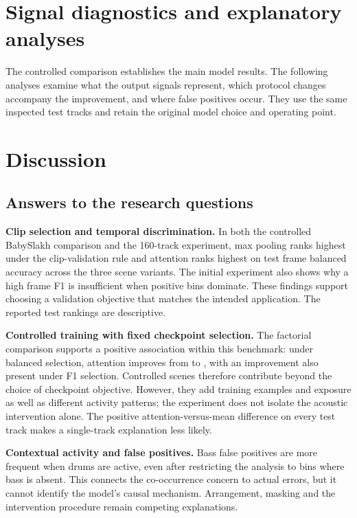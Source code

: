 \documentclass[10pt,a4paper]{article}
\begin{document}
\section{Signal diagnostics and explanatory analyses}
The controlled comparison establishes the main model results. The following analyses examine what the output signals represent, which protocol changes accompany the improvement, and where false positives occur. They use the same inspected test tracks and retain the original model choice and operating point.





\section{Discussion}
\subsection{Answers to the research questions}
\textbf{Clip selection and temporal discrimination.} In both the controlled BabySlakh comparison and the 160-track experiment, max pooling ranks highest under the clip-validation rule and attention ranks highest on test frame balanced accuracy across the three scene variants. The initial experiment also shows why a high frame F1 is insufficient when positive bins dominate. These findings support choosing a validation objective that matches the intended application. The reported test rankings are descriptive.

\textbf{Controlled training with fixed checkpoint selection.} The factorial comparison supports a positive association within this benchmark: under balanced selection, attention improves from \OriginalAttentionBA{} to \ControlledAttentionBABA{}, with an improvement also present under F1 selection. Controlled scenes therefore contribute beyond the choice of checkpoint objective. However, they add training examples and exposure as well as different activity patterns; the experiment does not isolate the acoustic intervention alone. The positive attention-versus-mean difference on every test track makes a single-track explanation less likely.

\textbf{Contextual activity and false positives.} Bass false positives are more frequent when drums are active, even after restricting the analysis to bins where bass is absent. This connects the co-occurrence concern to actual errors, but it cannot identify the model's causal mechanism. Arrangement, masking and the intervention procedure remain competing explanations.
\end{document}
